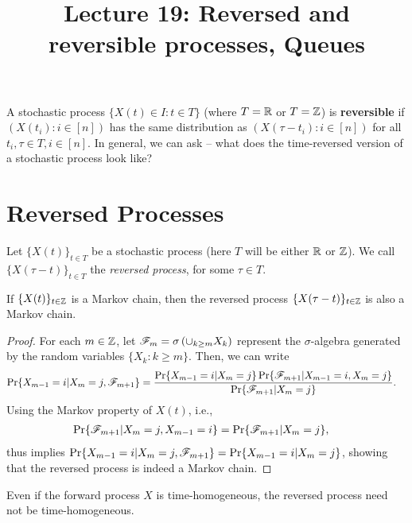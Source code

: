 \documentclass[a4paper,10pt,english]{article}
\title{Lecture 19: Reversed and reversible processes, Queues}
\author{}
\begin{document}
\maketitle

 A stochastic process $\{X(t) \in I: t \in T\}$ (where $T = \mathbb{R}$ or $T = \mathbb{Z}$) is \textbf{reversible} if $(X(t_i): i \in [n])$ has the same distribution as $(X(\tau-t_i): i \in [n])$ for all $t_i, \tau \in T, i \in [n]$. In general, we can ask -- what does the time-reversed version of a stochastic process look like?

\section{Reversed Processes}
Let $\{X(t)\}_{t \in T}$ be a stochastic process (here $T$ will be either $\mathbb{R}$ or $\mathbb{Z}$). We call $\{X(\tau-t)\}_{t \in T}$ the {\em reversed process}, for some $\tau \in T$.
\begin{lem} 
If $\{X(t)\}_{t \in \mathbb{Z}}$ is a Markov chain, then the reversed process $\{X(\tau -t)\}_{t \in \mathbb{Z}}$ is also a Markov chain.
\end{lem}
\begin{proof} For each $m \in \mathbb{Z}$, let $\mathscr{F}_m = \sigma \left(\cup_{k \geq m} X_k\right)$ represent the $\sigma$-algebra generated by the random variables $\{X_k: k \geq m\}$. Then, we can write
\begin{align*}
\Pr\{X_{m-1}=i|X_m=j,\F_{m+1}\} %
&=\frac{\Pr\{X_{m-1}=i|X_m=j\}\Pr\{\F_{m+1} |X_{m-1}=i,X_m=j \}}{\Pr\{\F_{m+1} |X_m=j\}}.
\end{align*}
Using the Markov property of $X(t)$, i.e.,
\begin{align*}
\Pr\{\mathscr{F}_{m+1} |X_m= j, X_{m-1} = i \} &=\Pr\{\mathscr{F}_{m+1}|X_m=j\},
\end{align*}
thus implies $\Pr\{X_{m-1}=i|X_m=j,\mathscr{F}_{m+1}\} = \Pr\{X_{m-1}=i|X_m=j\}$, showing that the reversed process is indeed a Markov chain. 
\end{proof}

\begin{rem}
Even if the forward process $X$ is time-homogeneous, the reversed process need not be time-homogeneous. 
\end{rem}
\end{document}
